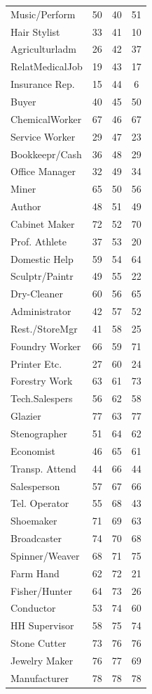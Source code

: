 \begin{tabular}{lccc}
Music/Perform&50&40&51\\
Hair Stylist&33&41&10\\
Agriculturladm&26&42&37\\
RelatMedicalJob&19&43&17\\
Insurance Rep.&15&44&6\\
Buyer&40&45&50\\
ChemicalWorker&67&46&67\\
Service Worker&29&47&23\\
Bookkeepr/Cash&36&48&29\\
Office Manager&32&49&34\\
Miner&65&50&56\\
Author&48&51&49\\
Cabinet Maker&72&52&70\\
Prof. Athlete&37&53&20\\
Domestic Help&59&54&64\\
Sculptr/Paintr&49&55&22\\
Dry-Cleaner&60&56&65\\
Administrator&42&57&52\\
Rest./StoreMgr&41&58&25\\
Foundry Worker&66&59&71\\
Printer Etc.&27&60&24\\
Forestry Work&63&61&73\\
Tech.Salespers&56&62&58\\
Glazier&77&63&77\\
Stenographer&51&64&62\\
Economist&46&65&61\\
Transp. Attend&44&66&44\\
Salesperson&57&67&66\\
Tel. Operator&55&68&43\\
Shoemaker&71&69&63\\
Broadcaster&74&70&68\\
Spinner/Weaver&68&71&75\\
Farm Hand&62&72&21\\
Fisher/Hunter&64&73&26\\
Conductor&53&74&60\\
HH Supervisor&58&75&74\\
Stone Cutter&73&76&76\\
Jewelry Maker&76&77&69\\
Manufacturer&78&78&78\\
\hline\hline
\end{tabular}
